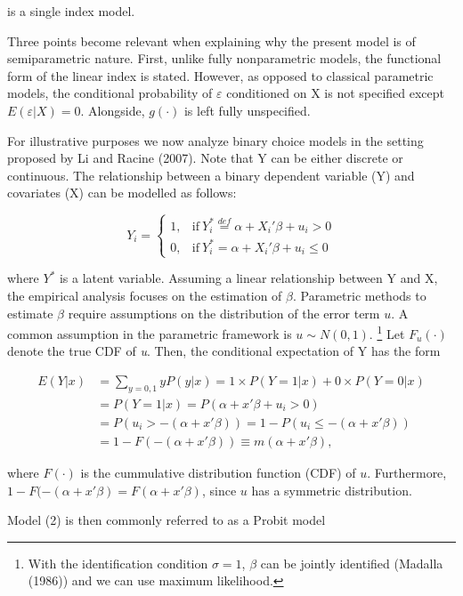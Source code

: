 \documentclass[a4paper]{article}
\begin{document}
is a single index model.
\vspace{2mm}

Three points become relevant when explaining why the present model is of  semiparametric nature. First, unlike fully nonparametric models, the functional form of the linear index is stated. However, as opposed to classical parametric models, the conditional probability of $\varepsilon$ conditioned on X is not specified except $ E(\varepsilon|X) = 0 $. Alongside, $g(\cdot)$ is left fully unspecified.

For illustrative purposes we now analyze binary choice models in the setting proposed by Li and Racine (2007). Note that Y can be either discrete or continuous. The relationship between a binary dependent variable (Y) and covariates (X) can be modelled as follows:

\[
    Y_i = 
    \begin{cases}
      1, & \text{if}\ Y_i^* \stackrel{def}{=} \alpha + X_i'\beta + u_i > 0 \\
      0, & \text{if}\ Y_i^* = \alpha + X_i'\beta + u_i \leq 0
    \end{cases}
\]

where $Y^{*}$ is a latent variable.
Assuming a linear relationship between Y and X, the empirical analysis focuses on the estimation of $\beta$.
Parametric methods to estimate $\beta$ require assumptions on the distribution of the error term $u$. A common assumption in the parametric framework is $ u \sim N(0, 1)$. \footnote{With the identification condition $\sigma = 1$, $\beta$ can be jointly identified (Madalla (1986)) and we can use maximum likelihood.}  Let $F_u(\cdot)$ denote the true CDF of \textit{u}. Then, the conditional expectation of Y has the form

\[ 
\begin{split}
E(Y|x) & = \sum_{y=0,1} yP(y|x) = 1 \times P(Y=1|x) + 0 \times P(Y=0|x) \\
 & = P(Y=1|x) = P(\alpha + x'\beta + u_i > 0) \\
 & = P(u_i > -(\alpha + x'\beta)) = 1 - P(u_i \leq -(\alpha + x'\beta)) \\
 & = 1 - F(-(\alpha + x'\beta)) \equiv m(\alpha + x'\beta),
\end{split}
\]


where $F(\cdot)$ is the cummulative distribution function (CDF) of $u$. Furthermore, $1 - F(-(\alpha + x'\beta) = F(\alpha + x'\beta)$, since $u$ has a symmetric distribution.

Model (2) is then commonly referred to as a Probit model
\end{document}
